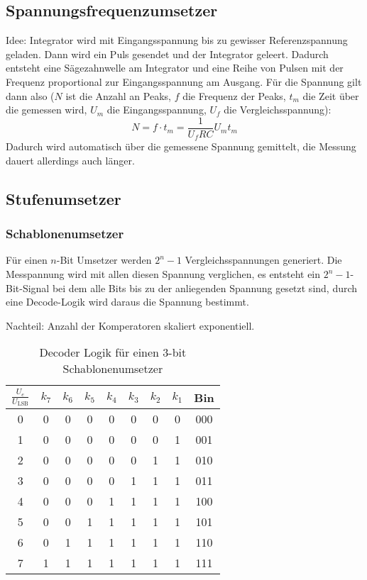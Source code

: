 \subsection{Spannungsfrequenzumsetzer}
Idee: Integrator wird mit Eingangsspannung bis zu gewisser Referenzspannung geladen. Dann wird ein Puls gesendet und der Integrator geleert.
Dadurch entsteht eine Sägezahnwelle am Integrator und eine Reihe von Pulsen mit der Frequenz proportional zur Eingangsspannung am Ausgang.
Für die Spannung gilt dann also ($N$ ist die Anzahl an Peaks, $f$ die Frequenz der Peaks, $t_m$ die Zeit über die gemessen wird, $U_m$ die Eingangsspannung,
$U_f$ die Vergleichsspannung):
\begin{equation*}
    N = f \cdot t_m = \frac{1}{U_f R C} U_m t_m
\end{equation*}
Dadurch wird automatisch über die gemessene Spannung gemittelt, die Messung dauert allerdings auch länger.

\subsection{Stufenumsetzer}
\subsubsection{Schablonenumsetzer}
Für einen $n$-Bit Umsetzer werden $2^n -1$ Vergleichsspannungen generiert.
Die Messpannung wird mit allen diesen Spannung verglichen, es entsteht ein $2^n-1$-Bit-Signal bei dem alle Bits bis zu der anliegenden Spannung gesetzt sind,
durch eine Decode-Logik wird daraus die Spannung bestimmt.

Nachteil: Anzahl der Komperatoren skaliert exponentiell.

\begin{table}[H]
    \centering
    \begin{tabular}{c|ccccccc|c}
        \toprule
        $\frac{U_e}{U_\text{LSB}}$ & $k_7$ & $k_6$ & $k_5$ & $k_4$ & $k_3$ & $k_2$ & $k_1$ & Bin \\
        \midrule
        0 & 0 & 0 & 0 & 0 & 0 & 0 & 0 & 000\\
        1 & 0 & 0 & 0 & 0 & 0 & 0 & 1 & 001\\
        2 & 0 & 0 & 0 & 0 & 0 & 1 & 1 & 010\\
        3 & 0 & 0 & 0 & 0 & 1 & 1 & 1 & 011\\
        4 & 0 & 0 & 0 & 1 & 1 & 1 & 1 & 100\\
        5 & 0 & 0 & 1 & 1 & 1 & 1 & 1 & 101\\
        6 & 0 & 1 & 1 & 1 & 1 & 1 & 1 & 110\\
        7 & 1 & 1 & 1 & 1 & 1 & 1 & 1 & 111\\
        \bottomrule
    \end{tabular}
    \caption{Decoder Logik für einen 3-bit Schablonenumsetzer}
\end{table}


